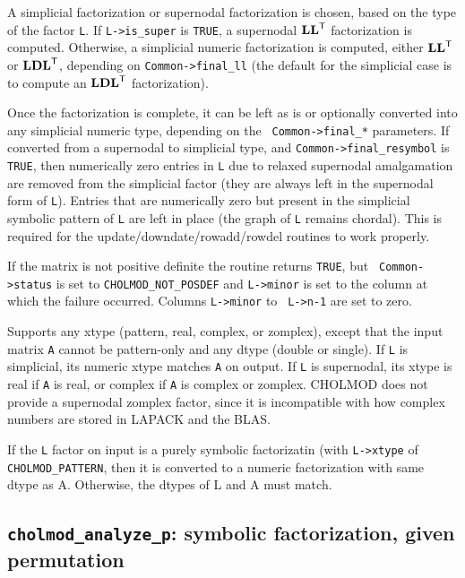 \documentclass[11pt]{article}
\newcommand{\m}[1]{{\bf{#1}}}       %
\newcommand{\tr}{^{\sf T}}          %
\begin{document}
A simplicial factorization or supernodal factorization is chosen, based on the
type of the factor {\tt L}.  If {\tt L->is\_super} is {\tt TRUE}, a supernodal
$\m{LL}\tr$ factorization is computed.  Otherwise, a simplicial numeric
factorization is computed, either $\m{LL}\tr$ or $\m{LDL}\tr$, depending on
{\tt Common->final\_ll} (the default for the simplicial case is to compute an
$\m{LDL}\tr$ factorization).

Once the factorization is complete, it can be left as is or optionally
converted into any simplicial numeric type, depending on the {\tt
Common->final\_*} parameters.  If converted from a supernodal to simplicial
type, and {\tt Common->final\_resymbol} is {\tt TRUE}, then numerically zero
entries in {\tt L} due to relaxed supernodal amalgamation are removed from the
simplicial factor (they are always left in the supernodal form of {\tt L}).
Entries that are numerically zero but present in the simplicial symbolic
pattern of {\tt L} are left in place (the graph of {\tt L} remains chordal).
This is required for the update/downdate/rowadd/rowdel routines to work
properly.

If the matrix is not positive definite the routine returns {\tt TRUE}, but {\tt
Common->status} is set to {\tt CHOLMOD\_NOT\_POSDEF} and {\tt L->minor} is set
to the column at which the failure occurred.  Columns {\tt L->minor} to {\tt
L->n-1} are set to zero.

Supports any xtype (pattern, real, complex, or zomplex), except that the input
matrix {\tt A} cannot be pattern-only and any dtype (double or single).  If
{\tt L} is simplicial, its numeric xtype matches {\tt A} on output.  If {\tt L}
is supernodal, its xtype is real if {\tt A} is real, or complex if {\tt A} is
complex or zomplex.  CHOLMOD does not provide a supernodal zomplex factor,
since it is incompatible with how complex numbers are stored in LAPACK and the
BLAS.

If the \verb'L' factor on input is a purely symbolic factorizatin (with
\verb'L->xtype' of \verb'CHOLMOD_PATTERN', then it is converted to a numeric
factorization with same dtype as A.  Otherwise, the dtypes of L and A must
match.

\subsection{{\tt cholmod\_analyze\_p}: symbolic factorization, given
permutation}
\end{document}
